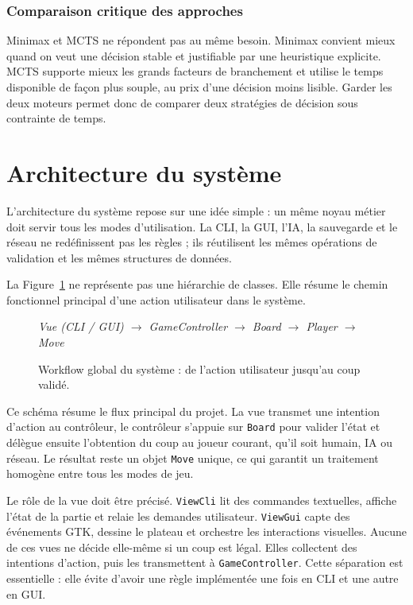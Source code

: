 \documentclass[a4paper]{article}
\begin{document}
\subsubsection{Comparaison critique des approches}

Minimax et MCTS ne répondent pas au même besoin. Minimax convient mieux quand on veut une décision stable et justifiable par une heuristique explicite. MCTS supporte mieux les grands facteurs de branchement et utilise le temps disponible de façon plus souple, au prix d'une décision moins lisible. Garder les deux moteurs permet donc de comparer deux stratégies de décision sous contrainte de temps.


\section{Architecture du système}

L'architecture du système repose sur une idée simple : un même noyau métier doit servir tous les modes d'utilisation. La CLI, la GUI, l'IA, la sauvegarde et le réseau ne redéfinissent pas les règles ; ils réutilisent les mêmes opérations de validation et les mêmes structures de données.

La Figure~\ref{fig:global-workflow} ne représente pas une hiérarchie de classes. Elle résume le chemin fonctionnel principal d'une action utilisateur dans le système.

\begin{figure}[H]
\centering
{\small\itshape
Vue (CLI / GUI) $\rightarrow$ GameController $\rightarrow$ Board $\rightarrow$ Player $\rightarrow$ Move\par
}
\caption{Workflow global du système : de l'action utilisateur jusqu'au coup validé.}
\label{fig:global-workflow}
\end{figure}

Ce schéma résume le flux principal du projet. La vue transmet une intention d'action au contrôleur, le contrôleur s'appuie sur \texttt{Board} pour valider l'état et délègue ensuite l'obtention du coup au joueur courant, qu'il soit humain, IA ou réseau. Le résultat reste un objet \texttt{Move} unique, ce qui garantit un traitement homogène entre tous les modes de jeu.

Le rôle de la vue doit être précisé. \texttt{ViewCli} lit des commandes textuelles, affiche l'état de la partie et relaie les demandes utilisateur. \texttt{ViewGui} capte des événements GTK, dessine le plateau et orchestre les interactions visuelles. Aucune de ces vues ne décide elle-même si un coup est légal. Elles collectent des intentions d'action, puis les transmettent à \texttt{GameController}. Cette séparation est essentielle : elle évite d'avoir une règle implémentée une fois en CLI et une autre en GUI.
\end{document}
